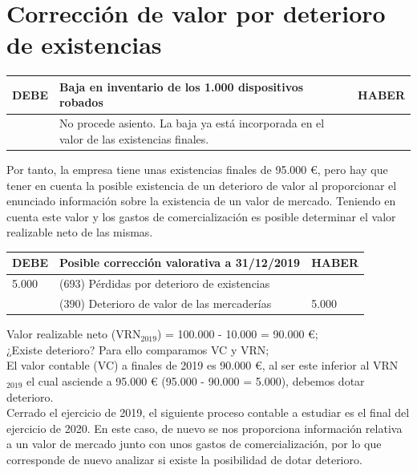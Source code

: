 \documentclass{article}
\begin{document}
\section*{Corrección de valor por deterioro de existencias}

\begin{table}[H]
    \centering
    \begin{tabular}{|p{4cm}|p{4cm}|p{4cm}|}
        \hline
        \textbf{DEBE} & \textbf{Baja en inventario de los 1.000 dispositivos robados} & \textbf{HABER} \\
        \hline
        & No procede asiento. La baja ya está incorporada en el valor de las existencias finales. & \\
        \hline
    \end{tabular}
\end{table}

Por tanto, la empresa tiene unas existencias finales de 95.000 €, pero hay que tener en cuenta la posible existencia de un deterioro de valor al proporcionar el enunciado información sobre la existencia de un valor de mercado. Teniendo en cuenta este valor y los gastos de comercialización es posible determinar el valor realizable neto de las mismas.

\begin{table}[h!]
\centering
\begin{tabular}{|l|l|l|}
\hline
\textbf{DEBE} & \textbf{Posible corrección valorativa a 31/12/2019} & \textbf{HABER} \\
\hline
5.000 & (693) Pérdidas por deterioro de existencias & \\
 & (390) Deterioro de valor de las mercaderías & 5.000 \\
\hline
\end{tabular}
\end{table}

Valor realizable neto (VRN\(_{2019}\)) = 100.000 - 10.000 = 90.000 €; \\
¿Existe deterioro? Para ello comparamos VC y VRN; \\
El valor contable (VC) a finales de 2019 es 90.000 €, al ser este inferior al VRN\(_{2019}\) el cual asciende a 95.000 € (95.000 - 90.000 = 5.000), debemos dotar deterioro. \\

Cerrado el ejercicio de 2019, el siguiente proceso contable a estudiar es el final del ejercicio de 2020. En este caso, de nuevo se nos proporciona información relativa a un valor de mercado junto con unos gastos de comercialización, por lo que corresponde de nuevo analizar si existe la posibilidad de dotar deterioro.
\end{document}
